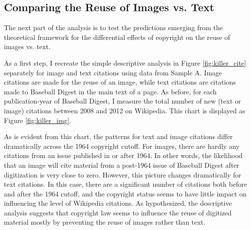 \documentclass[11pt]{article}
\begin{document}

\subsection{Comparing the Reuse of Images vs. Text}
\label{sec:diff1}

The next part of the analysis is to test the predictions emerging from the theoretical framework for the differential effects of copyright on the reuse of images vs. text.

As a first step, I recreate the simple descriptive analysis in Figure \ref{fig:killer_cite} separately for image and text citations using data from Sample A. Image citations are made for the reuse of an image, while text citations are citations made to Baseball Digest in the main text of a page. As before, for each publication-year of Baseball Digest, I measure the total number of new (text or image) citations between 2008 and 2012 on Wikipedia. This chart is displayed as Figure \ref{fig:killer_img}.  

As is evident from this chart, the patterns for text and image citations differ dramatically across the 1964 copyright cutoff. For images, there are hardly any citations from an issue published in or after 1964. In other words, the likelihood that an image will cite material from a post-1964 issue of Baseball Digest after digitization is very close to zero. However, this picture changes dramatically for text citations. In this case, there are a significant number of citations both before and after the 1964 cutoff, and the copyright status seems to have little impact on influencing the level of Wikipedia citations. As hypothesized, the descriptive analysis suggests that copyright law seems to influence the reuse of digitized material mostly by preventing the reuse of images rather than text. 
\end{document}
